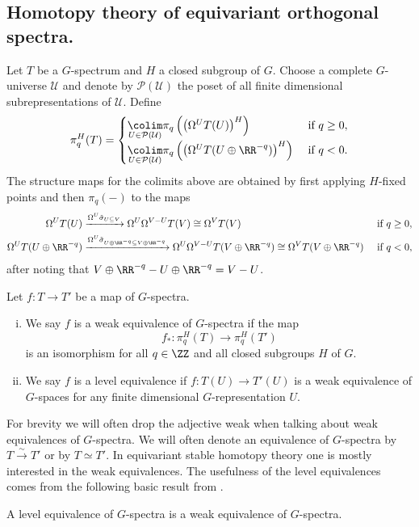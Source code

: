 \subsection{Homotopy theory of equivariant orthogonal spectra.}

\begin{mydef}
Let $T$ be a $G$-spectrum and $H$ a closed subgroup of $G$. Choose
a complete $G$-universe $\mathcal{U}$ and denote by $\mathcal{P}(\mathcal{U})$
the poset of all finite dimensional subrepresentations of $\mathcal{U}$. Define
\begin{equation}\label{eq:equivarianthomotopygroup}
\pi_q^H(T) = 
\begin{cases}
\underset{U\in \mathcal{P}(\mathcal{U})}{\colim} \pi_q\left(\left(\Omega^UT(U)\right)^H\right) &\text{ if } q\ge 0,\\
\underset{U\in \mathcal{P}(\mathcal{U})}{\colim} \pi_q\left(\left(\Omega^UT(U\oplus \RR^{-q})\right)^H\right) &\text{ if } q< 0.
\end{cases}
\end{equation}
The structure maps for the colimits above are obtained by first applying $H$-fixed points and then $\pi_q(-)$
to the maps
\begin{align}
\Omega^UT(U)&\xrightarrow{\Omega^U \tilde \sigma_{U\subseteq V}} \Omega^U\Omega^{V-U} T(V)\cong \Omega^{V} T(V)
&\text{ if } q\ge 0,\label{eq:homotopygroupstructuremap1}\\
\Omega^UT(U\oplus \RR^{-q})&\xrightarrow{\Omega^U \tilde \sigma_{U\oplus \RR^{-q}\subseteq V\oplus \RR^{-q}}} 
\Omega^U\Omega^{V-U} T(V\oplus \RR^{-q})\cong \Omega^{V} T(V\oplus \RR^{-q})
&\text{ if } q<0 \label{eq:homotopygroupstructuremap2},
\end{align}
after noting that $V\oplus \RR^{-q}-U\oplus \RR^{-q} = V-U$.
\end{mydef}
\begin{mydef}
Let $f:T\to T'$ be a map of $G$-spectra.
\begin{enumerate}[(i)]
\item We say $f$ is a weak equivalence of $G$-spectra
if the map
\[
f_\ast:\pi_q^H(T)\to \pi_q^H(T')
\]
is an isomorphism for all $q\in \ZZ$ and all closed subgroups $H$
of $G$.
\item We say $f$ is a level equivalence if $f:T(U)\to T'(U)$
is a weak equivalence of $G$-spaces for any finite dimensional
$G$-representation $U$.
\end{enumerate}
\end{mydef}
For brevity we will often drop the adjective weak when
talking about weak equivalences of $G$-spectra.
We will often denote an equivalence of $G$-spectra by
$T\xrightarrow{\sim} T'$ or by $T\simeq T'$. In equivariant
stable homotopy theory one is mostly interested in the weak
equivalences. The usefulness of the level equivalences comes
from the following basic result from \cite[Lemma~III.3.3, \pno~45]{mandellmay}.
\begin{lem}
A level equivalence of $G$-spectra is a weak equivalence of $G$-spectra.
\end{lem}

